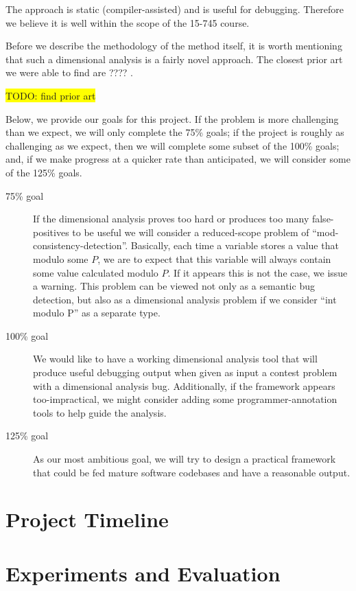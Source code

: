 \documentclass[12pt]{article}
\begin{document}
The approach is static (compiler-assisted) and is useful for debugging. Therefore we believe it is well within the scope of the 15-745 course.

Before we describe the methodology of the method itself, it is worth mentioning that such a dimensional analysis is a fairly novel approach. The closest prior art we were able to find are ???? \cite{hilfinger1988ada}. %

\colorbox{yellow}{TODO: find prior art}

Below, we provide our goals for this project. If the problem is more challenging than we expect, we will only complete the 75\% goals; if the project is roughly as challenging as we expect, then we will complete some subset of the 100\% goals; and, if we make progress at a quicker rate than anticipated, we will consider some of the 125\% goals.
\begin{description}
\item [75\% goal] If the dimensional analysis proves too hard or produces too many false-positives to be useful we will consider a reduced-scope problem of ``mod-consistency-detection''. Basically, each time a variable stores a value that modulo some $P$, we are to expect that this variable will always contain some value calculated modulo $P$. If it appears this is not the case, we issue a warning. This problem can be viewed not only as a semantic bug detection, but also as a dimensional analysis problem if we consider ``int modulo P'' as a separate type.

\item [100\% goal] We would like to have a working dimensional analysis tool that will produce useful debugging output when given as input a contest problem with a dimensional analysis bug. Additionally, if the framework appears too-impractical, we might consider adding some programmer-annotation tools to help guide the analysis. 

\item [125\% goal] As our most ambitious goal, we will try to design a practical framework that could be fed mature software codebases and have a reasonable output.
\end{description}

\section{Project Timeline}

\section{Experiments and Evaluation}
\end{document}
